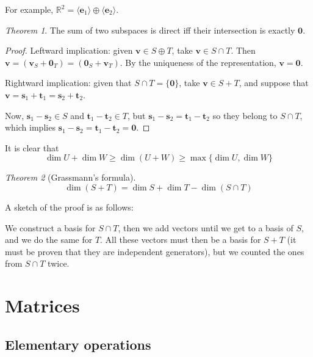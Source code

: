 \documentclass[12pt,a4paper]{report}
\numberwithin{equation}{section}
\theoremstyle{definition}
\theoremstyle{remark}
\newtheorem{theorem}{Theorem}[section]
\begin{document}
For example, $\mathbb{R}^2 = \langle \mathbf{e}_1 \rangle \oplus \langle \mathbf{e}_2 \rangle$.

\begin{theorem}
The sum of two subspaces is direct iff their intersection is exactly $\mathbf{0}$.
\end{theorem}

\begin{proof}
Leftward implication: given $\mathbf{v} \in S \oplus T$, take $\mathbf{v} \in S\cap T$. Then $\mathbf{v} = (\mathbf{v}_S + \mathbf{0}_T) = (\mathbf{0}_S + \mathbf{v}_T)$. By the uniqueness of the representation, $\mathbf{v} = \mathbf{0}$.

Rightward implication: given that $S \cap T = \lbrace \mathbf{0}\rbrace$, take $\mathbf{v} \in S+T$, and suppose that $\mathbf{v} = \mathbf{s}_1 + \mathbf{t}_1 = \mathbf{s}_2 + \mathbf{t}_2$.

Now, $\mathbf{s}_1 - \mathbf{s}_2 \in S$ and $\mathbf{t}_1 - \mathbf{t}_2 \in T$, but $\mathbf{s}_1 - \mathbf{s}_2 = \mathbf{t}_1 - \mathbf{t}_2$ so they belong to $S \cap T$, which implies $\mathbf{s}_1 - \mathbf{s}_2 = \mathbf{t}_1 - \mathbf{t}_2 = \mathbf{0}$.
\end{proof}

It is clear that
\begin{equation}
\dim U + \dim W \geq \dim (U+W) \geq \max \lbrace \dim U , \dim W \rbrace
\end{equation}

\begin{theorem}[Grassmann's formula]
\begin{equation}
\dim (S+T) = \dim S + \dim T - \dim (S\cap T)
\end{equation}
\end{theorem}

A sketch of the proof is as follows:

We construct a basis for $S \cap T$, then we add vectors until we get to a basis of $S$, and we do the same for $T$. All these vectors must then be a basis for $S+T$ (it must be proven that they are independent generators), but we counted the ones from $S\cap T$ twice. 

\chapter{Matrices}

\section{Elementary operations}
\end{document}
